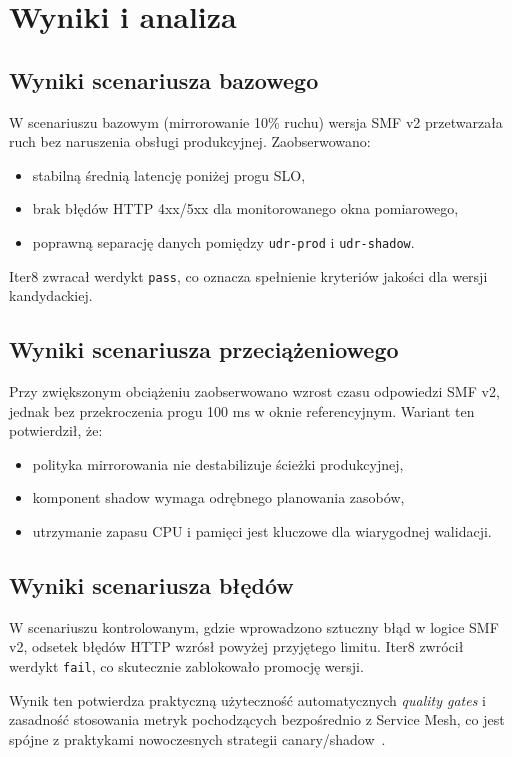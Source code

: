 \chapter{Wyniki i analiza}

\section{Wyniki scenariusza bazowego}
W scenariuszu bazowym (mirrorowanie 10\% ruchu) wersja SMF v2 przetwarzała ruch bez naruszenia obsługi produkcyjnej. Zaobserwowano:
\begin{itemize}
    \item stabilną średnią latencję poniżej progu SLO,
    \item brak błędów HTTP 4xx/5xx dla monitorowanego okna pomiarowego,
    \item poprawną separację danych pomiędzy \texttt{udr-prod} i \texttt{udr-shadow}.
\end{itemize}

Iter8 zwracał werdykt \texttt{pass}, co oznacza spełnienie kryteriów jakości dla wersji kandydackiej.

\section{Wyniki scenariusza przeciążeniowego}
Przy zwiększonym obciążeniu zaobserwowano wzrost czasu odpowiedzi SMF v2, jednak bez przekroczenia progu 100 ms w oknie referencyjnym. Wariant ten potwierdził, że:
\begin{itemize}
    \item polityka mirrorowania nie destabilizuje ścieżki produkcyjnej,
    \item komponent shadow wymaga odrębnego planowania zasobów,
    \item utrzymanie zapasu CPU i pamięci jest kluczowe dla wiarygodnej walidacji.
\end{itemize}

\section{Wyniki scenariusza błędów}
W scenariuszu kontrolowanym, gdzie wprowadzono sztuczny błąd w logice SMF v2, odsetek błędów HTTP wzrósł powyżej przyjętego limitu. Iter8 zwrócił werdykt \texttt{fail}, co skutecznie zablokowało promocję wersji.

Wynik ten potwierdza praktyczną użyteczność automatycznych \emph{quality gates} i zasadność stosowania metryk pochodzących bezpośrednio z Service Mesh, co jest spójne z praktykami nowoczesnych strategii canary/shadow~\cite{fink2017canary}.

